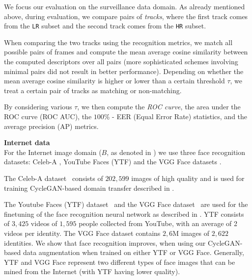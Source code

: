 We focus our evaluation on the surveillance data domain. As already mentioned above, during evaluation, we compare pairs of \textit{tracks}, where the first track comes from the \texttt{LR} subset and the second track comes from the \texttt{HR} subset. 

When comparing the two tracks using the recognition metrics, we match all possible pairs of frames and compute the mean average cosine similarity between the computed descriptors over all pairs (more sophisticated schemes involving minimal pairs did not result in better performance). Depending on whether the mean average cosine similarity is higher or lower than a certain threshold $\tau$, we treat a certain pair of tracks as matching or non-matching.

By considering various $\tau$, we then compute the \textit{ROC curve}, the area under the ROC curve (ROC AUC), the $100$\% - EER (Equal Error Rate) statistics, and the average precision (AP) metrics. 



\bigskip\indent\textbf{Internet data}\\
For the Internet image domain ($B$, as denoted in ) we use three face recognition datasets: Celeb-A \citep{liu2015faceattributes}, YouTube Faces (YTF) \citep{WolfHM11} and the VGG Face datasets \citep{parkhi2015deep}.

The Celeb-A dataset~\citep{liu2015faceattributes} consists of $202,599$ images of high quality and is used for training CycleGAN-based  domain transfer described in . 

The Youtube Faces (YTF) dataset~\citep{WolfHM11} and the VGG Face dataset~\citep{parkhi2015deep} are used for the finetuning of the face recognition neural network as described in . YTF consists of $3,425$ videos of $1,595$
people collected from YouTube, with an average of 2 videos per identity. The VGG Face dataset contains $2,6$M images of $2,622$ identities. We show that face recognition improves, when using our CycleGAN-based data augmentation when trained on either YTF or VGG Face. Generally, YTF and VGG Face represent two different types of face images that can be mined from the Internet (with YTF having lower quality).








